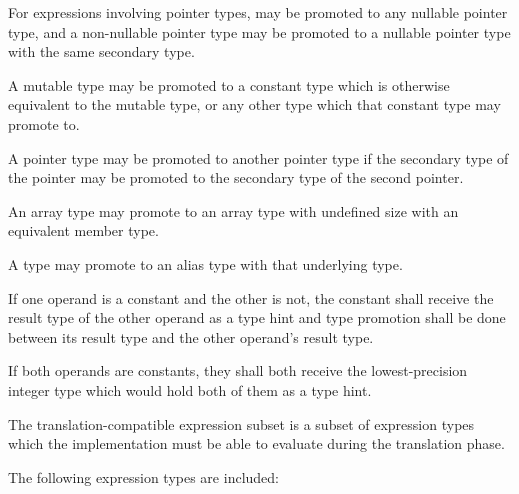 \specsubitem
For expressions involving pointer types,  may be promoted to any
nullable pointer type, and a non-nullable pointer type may be promoted to
a nullable pointer type with the same secondary type.

\specsubitem
A mutable type may be promoted to a constant type which is otherwise equivalent
to the mutable type, or any other type which that constant type may promote to.

\specsubitem
A pointer type may be promoted to another pointer type if the secondary type of
the pointer may be promoted to the secondary type of the second pointer.

\specsubitem
An array type may promote to an array type with undefined size with an
equivalent member type.

\specsubitem
A type may promote to an alias type with that underlying type.


\specsubitem
If one operand is a constant and the other is not, the constant shall receive
the result type of the other operand as a type hint and type promotion shall be
done between its result type and the other operand's result type.

\specsubitem
If both operands are constants, they shall both receive the lowest-precision
integer type which would hold both of them as a type hint.


The translation-compatible expression subset is a subset of expression types
which the implementation must be able to evaluate during the translation phase.

\specsubitem
The following expression types are included:

